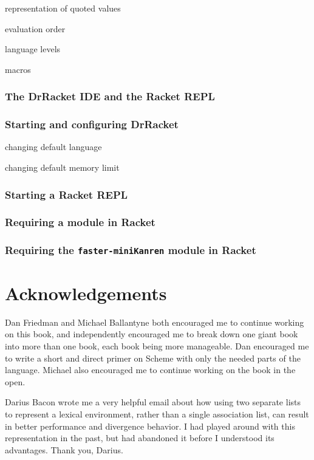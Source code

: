 \documentclass{book}
\begin{document}
representation of quoted values

evaluation order

language levels

macros

\subsubsection{The DrRacket IDE and the Racket REPL}

\subsubsection{Starting and configuring DrRacket}

changing default language

changing default memory limit

\subsubsection{Starting a Racket REPL}

\subsubsection{Requiring a module in Racket}

\subsubsection{Requiring the \texttt{faster-miniKanren} module in Racket}

\section{Acknowledgements}

Dan Friedman and Michael Ballantyne both encouraged me to continue working on this book, and independently encouraged me to break down one giant book into more than one book, each book being more manageable.
%
Dan encouraged me to write a short and direct primer on Scheme with only the needed parts of the language.
%
Michael also encouraged me to continue working on the book in the open.

Darius Bacon wrote me a very helpful email about how using two separate lists to represent a lexical environment, rather than a single association list, can result in better performance and divergence behavior.  I had played around with this representation in the past, but had abandoned it before I understood its advantages.  Thank you, Darius.
\end{document}
